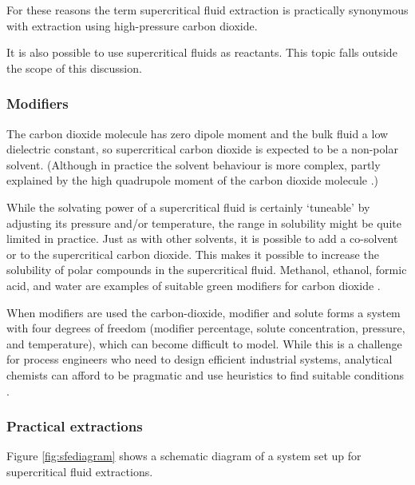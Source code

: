 For these reasons the term supercritical fluid extraction is practically
synonymous with extraction using high-pressure carbon dioxide.

It is also possible to use supercritical fluids as reactants. This topic
falls outside the scope of this discussion.
 
\subsubsection{Modifiers}

\label{sec:modifiers}

The carbon dioxide molecule has zero dipole moment and the bulk fluid a low
dielectric constant, so supercritical carbon dioxide is expected to be
a non-polar solvent. (Although in practice the solvent behaviour is more
complex, partly explained by the high quadrupole moment of the carbon dioxide
molecule \autocite{Raveendran2005}.)

While the solvating power of a supercritical fluid is certainly `tuneable' by
adjusting its pressure and/or temperature, the range in solubility might be
quite limited in practice. Just as with other solvents, it is possible to add a
co-solvent or  to the supercritical carbon dioxide. This makes
it possible to increase the solubility of polar compounds in the supercritical
fluid. Methanol, ethanol, formic acid, and water are examples of suitable green
modifiers for carbon dioxide \autocite{Herrero2010}.

When modifiers are used the carbon-dioxide, modifier and solute forms a system
with four degrees of freedom (modifier percentage, solute concentration,
pressure, and temperature), which can become difficult to model. While this is a
challenge for process engineers who need to design efficient industrial systems,
analytical chemists can afford to be pragmatic and use heuristics to find
suitable conditions \autocite{Wells2003}.

\subsubsection{Practical extractions}

Figure \ref{fig:sfediagram} shows a schematic diagram of a system set up for
supercritical fluid extractions.

